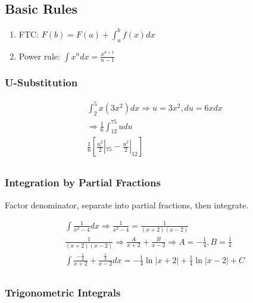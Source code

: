 \subsection{Basic Rules}\label{subsec:basic-rules}

\begin{enumerate}
    \item FTC: $F(b)=F(a)+\int_{a}^{b}f(x)dx$
    \item Power rule: $\int{x^n}dx=\frac{x^{n+1}}{n-1}$
\end{enumerate}

\subsubsection{U-Substitution}

\begin{gather*}
    \int_{2}^{5}x(3x^2)dx \Rightarrow u=3x^2, du=6xdx\\
    \Rightarrow \frac{1}{6}\int_{12}^{75}udu\\
    \frac{1}{6}[\frac{u^2}{2}|_{75}-\frac{u^2}{2}|_{12}]\\
\end{gather*}

\subsubsection{Integration by Partial Fractions}

Factor denominator, separate into partial fractions, then integrate.

\begin{gather*}
    \int{\frac{1}{x^2-4}}dx \Rightarrow \frac{1}{x^2-4}=\frac{1}{(x+2)(x-2)}\\
    \frac{1}{(x+2)(x-2)} \Rightarrow \frac{A}{x+2}+\frac{B}{x-2} \Rightarrow A=-\frac{1}{4}, B=\frac{1}{4}\\
    \int{\frac{-\frac{1}{4}}{x+2}+\frac{\frac{1}{4}}{x-2}}dx=-\frac{1}{4}\ln{|x+2|}+\frac{1}{4}\ln{|x-2|}+C\\
\end{gather*}

\subsubsection{Trigonometric Integrals}

